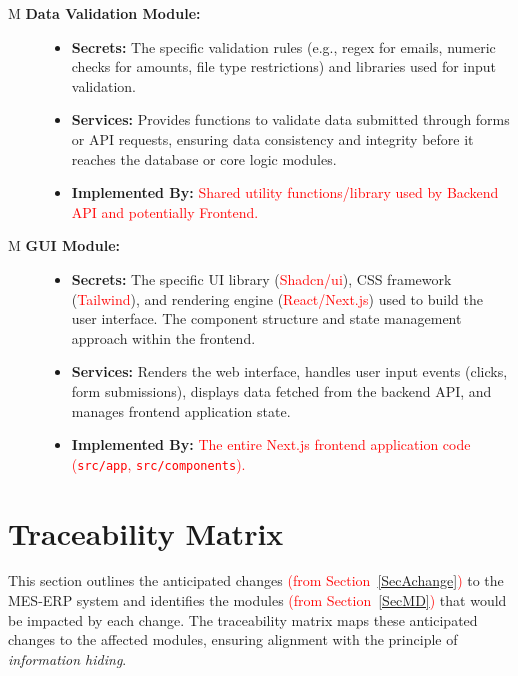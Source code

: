 \documentclass[12pt, titlepage]{article}
\newcounter{mnum}
\newcommand{\mthemnum}{M\themnum}
\begin{document}
\begin{description}
\item[ \mthemnum \label{mValidation} \textbf{Data Validation Module:}]
    \begin{itemize}
        \item \textbf{Secrets:} The specific validation rules (e.g., regex for emails, numeric checks for amounts, file type restrictions) and libraries used for input validation.
        \item \textbf{Services:} Provides functions to validate data submitted through forms or API requests, ensuring data consistency and integrity before it reaches the database or core logic modules.
        \item \textbf{Implemented By:} \textcolor{red}{Shared utility functions/library used by Backend API and potentially Frontend.}
    \end{itemize}

\item[ \mthemnum \label{mGUI} \textbf{GUI Module:}]
    \begin{itemize}
        \item \textbf{Secrets:} The specific UI library (\textcolor{red}{Shadcn/ui}), CSS framework (\textcolor{red}{Tailwind}), and rendering engine (\textcolor{red}{React/Next.js}) used to build the user interface. The component structure and state management approach within the frontend.
        \item \textbf{Services:} Renders the web interface, handles user input events (clicks, form submissions), displays data fetched from the backend API, and manages frontend application state.
        \item \textbf{Implemented By:} \textcolor{red}{The entire Next.js frontend application code (\texttt{src/app}, \texttt{src/components}).}
    \end{itemize}
\end{description}

\section{Traceability Matrix}

This section outlines the anticipated changes \textcolor{red}{(from Section~\ref{SecAchange})} to the MES-ERP system and identifies the modules \textcolor{red}{(from Section~\ref{SecMD})} that would be impacted by each change. The traceability matrix maps these anticipated changes to the affected modules, ensuring alignment with the principle of \textit{information hiding}.
\end{document}
